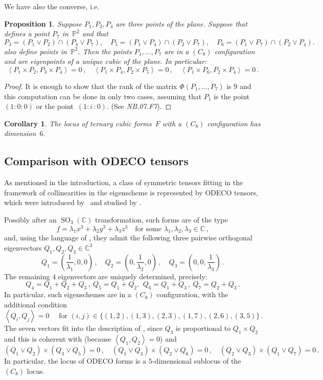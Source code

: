 \documentclass[a4paper, 11pt, reqno]{amsart}
\theoremstyle{plain}
\newtheorem{prop}[lemma]{Proposition}
\newtheorem{corollary}[lemma]{Corollary}
\theoremstyle{definition}
\newcommand{\C}{\mathbb{C}}
\newcommand{\p}{\mathbb{P}}
\newcommand{\nb}[2]{\textsl{{NB}.{#1}.{#2}}}
\newcommand{\iii}{\textit{i}\,}
\newcommand{\SO}{\operatorname{SO}}
\newcommand{\scl}[2]{\left\langle {#1}, {#2} \right\rangle}
\begin{document}
We have also the converse, i.e.\
\begin{prop}
Suppose $P_1, P_2, P_4$ are three points of the plane. Suppose that  defines a point $P_7$ 
in~$\p^2$ and that
%
\[
P_3 = (P_1 \vee P_2) \cap(P_4 \vee P_7), \quad 
P_5 = (P_1 \vee P_4) \cap (P_2 \vee P_7), \quad
P_6 = (P_1 \vee P_7) \cap (P_2 \vee P_4).
\]
%
also define points in~$\p^2$.
Then the points $P_1, \dotsc, P_7$ are in a $(C_8)$ configuration
and are eigenpoints of a unique cubic 
of the plane. In particular:
\[
  \scl{P_1 \times P_2}{P_3 \times P_4} = 0 \,, \quad 
  \scl{P_1 \times P_4}{P_2 \times P_5} = 0 \,, \quad 
  \scl{P_1 \times P_6}{P_2 \times P_4} = 0 \,.
\]
\end{prop}
\begin{proof}
It is enough to show that the rank of the matrix $\Phi(P_1, \dots, P_7)$
is $9$ and this computation can be done in only two
cases, assuming that 
$P_1$ is the point~$(1: 0: 0)$ or the point~$(1: \iii: 0)$.
(See \nb{07}{F7}).
\end{proof}

\begin{corollary}
The locus of ternary cubic forms~$F$ with a $(C_8)$ configuration has dimension~$6$.
\end{corollary}


\subsection*{Comparison with ODECO tensors}
As mentioned in the introduction, a class of
symmetric tensors fitting in the framework of collinearities in the eigenscheme is represented by ODECO tensors, which were introduced by~\cite{Rob} and studied by \cite{BDHE, Koiran2021, Biaggi2022}.

Possibly after an $\SO_3(\C)$ transformation, such forms are of the type
%
\[
  f = \lambda_1 x^3 +\lambda_2 y^3 + \lambda_3 z^3
  \quad \text{for some } \lambda_1, \lambda_2, \lambda_3 \in \C \,,
\]
%
and, using the language of \cite{Rob}, they admit the following three pairwise orthogonal eigenvectors $Q_1, Q_2, Q_3 \in \C^3$
%
\[
  Q_1 = \left( \frac{1}{\lambda_1},0,0 \right) \,, \quad
  Q_2 = \left( 0,\frac{1}{\lambda_2},0 \right) \,, \quad
  Q_3 = \left( 0,0,\frac{1}{\lambda_3} \right) \,.
\]
%
The remaining $4$ eigenvectors are uniquely determined, precisely:
%
\[
  Q_4 = Q_1+Q_2+Q_3\,, \ Q_5 = Q_1+Q_2,\, \ Q_6 = Q_1+Q_3 \,, \ Q_7 = Q_2+Q_3\,.
\]
%
In particular, such eigenschemes are in a $(C_8)$ configuration, with the additional condition
%
\[
  \left\langle Q_i,Q_j \right\rangle = 0
  \quad \text{ for } (i, j) \in \{(1, 2), (1, 3), (2, 3), (1, 7), (2, 6), (3, 5)\} \,.
\]
%
The seven vectors fit into the description of , since $Q_3 $ is proportional to $Q_1 \times Q_2$ and this is coherent with 
(because $\scl{Q_1}{Q_2} = 0$)
and
%
\[
  (Q_1 \vee Q_2) \times (Q_3 \vee Q_5) = 0 \,, \quad
  (Q_1 \vee Q_3) \times (Q_2 \vee Q_6) = 0 \,, \quad
  (Q_2 \vee Q_3) \times (Q_1 \vee Q_7) = 0 \,.
\]
%
In particular, the locus of ODECO forms is a $5$-dimensional sublocus of the $(C_8)$ locus.
\end{document}
